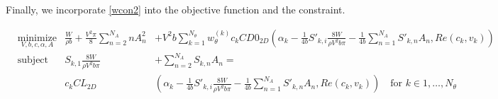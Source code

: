 \documentclass[letterpaper,12pt]{article}
\begin{document}


Finally, we incorporate \ref{wcon2} into the objective function and the constraint.

\begin{align*}
	& \underset{V, b, c, \alpha, A}{\text{minimize}} &
	\frac{W}{\rho b} + \frac{V^2 \pi}{8}\sum_{n=2}^{N_A} n A_{n}^2 &+
	  V^2 b  \sum_{k=1}^{N_{\theta}} w_{\theta}^{(k)} c_k CD0_{2D}
	  \left( \alpha_k
	  - \frac {1}{4b} S'_{k,i}\frac{8W}{\rho V^2 b \pi}
	  - \frac {1}{4b}\sum_{n=1}^{N_{A}}S'_{k,n}A_n , Re(c_k, v_k)
	  \right)\\
	& \text{subject to} &
 	S_{k, 1} \frac{8W}{\rho V^2 b \pi} &+ \sum_{n=2}^{N_{A}} S_{k,n} A_n = \\
	& & c_kCL_{2D} & \left( \alpha_k
		 - \frac {1}{4b} S'_{k,i}\frac{8W}{\rho V^2 b \pi}
		 - \frac {1}{4b}\sum_{n=1}^{N_{A}}S'_{k,n}A_n , Re(c_k, v_k)\right)
		 \quad \text{for } k \in 1,\dots, N_{\theta}
\end{align*}
\end{document}

